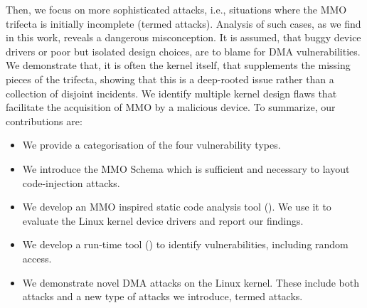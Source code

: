 Then, we focus on more sophisticated attacks, i.e., situations where the MMO trifecta is initially incomplete (termed \compound attacks).
Analysis of such cases, as we find in this work, reveals a dangerous misconception. It is assumed, that buggy device drivers or poor but isolated design choices, are to blame for DMA vulnerabilities. 
We demonstrate that, it is often the kernel itself, that supplements the missing pieces of the trifecta, showing that this is a deep-rooted issue rather than a collection of disjoint incidents.
We identify multiple kernel design flaws that facilitate the acquisition of MMO by a malicious device.
%
%
To summarize, our contributions are:
\begin{itemize}
    \item We provide a categorisation of the four \subpage{} vulnerability types.
    \item We introduce the MMO Schema which is sufficient and necessary to layout code-injection attacks.
    \item We develop an MMO inspired static code analysis tool (\tool). We use it to evaluate the Linux kernel device drivers and report our findings.
    \item We develop a run-time tool (\dkasan) to identify \subpage{} vulnerabilities, including random access.
    \item We demonstrate novel DMA attacks on the Linux kernel. These include both \simple{} attacks and a new type of attacks we introduce, termed \compound{} attacks.
\end{itemize}





